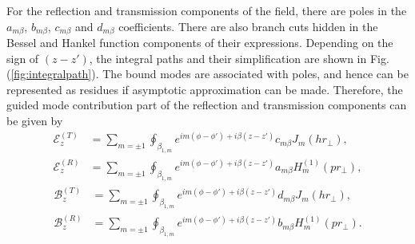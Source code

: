 \documentclass[]{report}
\begin{document}
For the reflection and transmission components of the field, there are poles in the $ a_{m\beta} $, $ b_{m\beta} $, $ c_{m\beta} $ and $ d_{m\beta} $ coefficients. There are also branch cuts hidden in the Bessel and Hankel function components of their expressions. Depending on the sign of $ (z-z') $, the integral paths and their simplification are shown in Fig.(\ref{fig:integralpath}). The bound modes are associated with poles, and hence can be represented as residues if asymptotic approximation can be made. Therefore, the guided mode contribution part of the reflection and transmission components can be given by
\begin{subequations}\label{ET0RRes}
\begin{align}
\mathcal{E}^{(T)}_z &= \sum_{m=\pm 1} \oint_{\beta_{1,m}}  e^{im(\phi\!-\!\phi') + i\beta (z\!-\!z')} c_{m\beta} J_m (hr\!_\perp),\\
\mathcal{E}^{(R)}_z &= \sum_{m=\pm 1} \oint_{\beta_{1,m}} e^{im(\phi\!-\!\phi') + i\beta (z\!-\!z')} a_{m\beta} H_m^{(1)} (pr\!_\perp),
\end{align}
\end{subequations}
\begin{subequations}\label{BT0RRes}
\begin{align}
\mathcal{B}^{(T)}_z &= \sum_{m=\pm 1} \oint_{\beta_{1,m}} e^{im(\phi\!-\!\phi') + i\beta (z\!-\!z')} d_{m\beta} J_m (hr\!_\perp),\\
\mathcal{B}^{(R)}_z &= \sum_{m=\pm 1} \oint_{\beta_{1,m}} e^{im(\phi\!-\!\phi') + i\beta (z\!-\!z')} b_{m\beta} H_m^{(1)} (pr\!_\perp).
\end{align}
\end{subequations}
\end{document}
